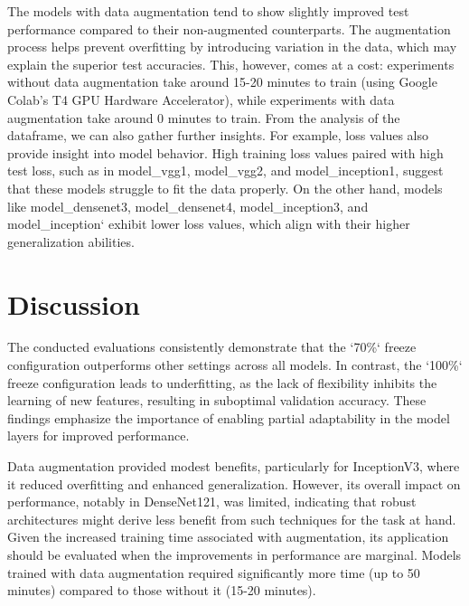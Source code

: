 The models with data augmentation tend to show slightly improved test performance compared to their non-augmented
counterparts. The augmentation process helps prevent overfitting by introducing variation in the data, which may
explain the superior test accuracies. This, however, comes at a cost: experiments without data augmentation take
around 15-20 minutes to train (using Google Colab's T4 GPU Hardware Accelerator), while experiments with data
augmentation take around 0 minutes to train.
From the analysis of the dataframe, we can also gather further insights. For example, loss values also provide insight
into model behavior. High training loss values paired with high test loss, such as in model\_vgg1, model\_vgg2, and
model\_inception1, suggest that these models struggle to fit the data properly. On the other hand, models like
model\_densenet3, model\_densenet4, model\_inception3, and model\_inception` exhibit lower loss values,
which align with their higher generalization abilities.


\section{Discussion}

The conducted evaluations consistently demonstrate that the `70\%` freeze configuration outperforms other settings across all models.
In contrast, the `100\%` freeze configuration leads to underfitting, as the lack of flexibility inhibits the learning
of new features, resulting in suboptimal validation accuracy. These findings emphasize the importance of enabling
partial adaptability in the model layers for improved performance.

\vspace{0.3cm}

Data augmentation provided modest benefits, particularly for InceptionV3, where it reduced overfitting and enhanced
generalization. However, its overall impact on performance, notably in DenseNet121, was limited, indicating that robust
architectures might derive less benefit from such techniques for the task at hand. Given the increased training time
associated with augmentation, its application should be evaluated when the improvements in performance are marginal.
Models trained with data augmentation required significantly more time (up to 50 minutes) compared to those
without it (15-20 minutes).

